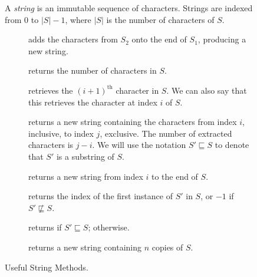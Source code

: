 \begin{figure}[tp]
  \small
  \begin{tcolorbox}[title=String Class]
    A \textit{string} is an immutable sequence of characters. Strings are indexed from $0$ to $|S|-1$, where $|S|$ is the number of characters of $S$.
    \vspace{2ex}
  \begin{description}
    \item[] adds the characters from $S_2$ onto the end of $S_1$, producing a new string.
    \item[] returns the number of characters in $S$.
    \item[] retrieves the $(i + 1)^\text{th}$ character in $S$. We can also say that this retrieves the character at index $i$ of $S$.
    \item[] returns a new string containing the characters from index $i$, inclusive, to index $j$, exclusive. The number of extracted characters is $j - i$. We will use the notation $S' \sqsubseteq S$ to denote that $S'$ is a substring of $S$.
    \item[] returns a new string from index $i$ to the end of $S$.
    \item[] returns the index of the first instance of $S'$ in $S$, or $-1$ if $S' \not\sqsubseteq S$.
    \item[] returns  if $S' \sqsubseteq S$;  otherwise.
    \item[] returns a new string containing $n$ copies of $S$.
  \end{description}
\end{tcolorbox}
  \caption{Useful String Methods.}
  \label{fig:strings}
\end{figure}

